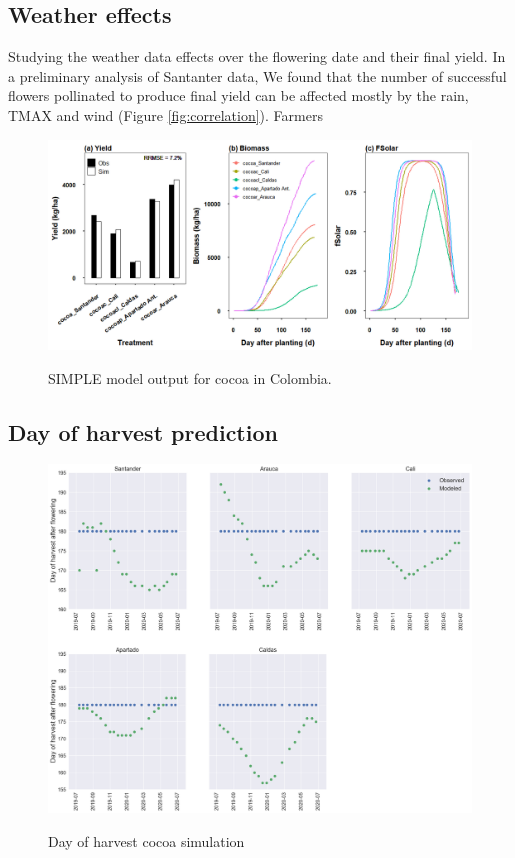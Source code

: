 \documentclass[gene,journal,article,submit,moreauthors,pdftex]{Definitions/mdpi}
\begin{document}
\subsection{Weather effects}
Studying the weather data effects over the flowering date and their final yield. In a preliminary analysis of Santanter data, We found that the number of successful flowers pollinated to produce final yield can be affected mostly by the rain, TMAX and wind (Figure \ref{fig:correlation}). Farmers 


\begin{figure}[h!]
	\centering
	\caption{\footnotesize {SIMPLE model output for cocoa in Colombia.\\ }} 
	\includegraphics[scale=0.35]{images/outmodel.png}
	\label{fig:m1}
\end{figure}

\subsection{Day of harvest prediction}
\begin{figure}[h!]
	\centering
	\caption{\footnotesize {Day of harvest cocoa simulation\\ }} 
	\includegraphics[scale=0.4]{images/RegionHarvest.png}
	\label{fig:dayH}
\end{figure}
\end{document}
